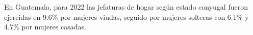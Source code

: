 En Guatemala, para 2022 las jefaturas de hogar según estado conyugal fueron ejercidas en 9.6\% por mujeres viudas, seguido por mujeres solteras con 6.1\% y 4.7\% por mujeres casadas. 
